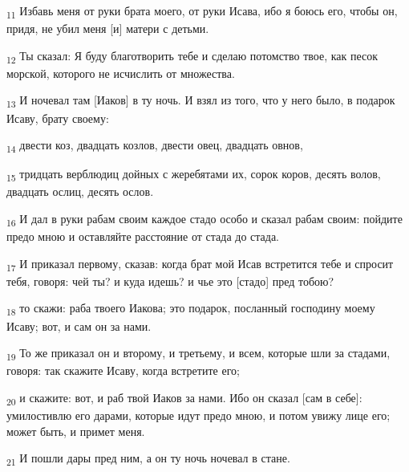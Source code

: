\begin{tcolorbox}
\textsubscript{11} Избавь меня от руки брата моего, от руки Исава, ибо я боюсь его, чтобы он, придя, не убил меня [и] матери с детьми.
\end{tcolorbox}
\begin{tcolorbox}
\textsubscript{12} Ты сказал: Я буду благотворить тебе и сделаю потомство твое, как песок морской, которого не исчислить от множества.
\end{tcolorbox}
\begin{tcolorbox}
\textsubscript{13} И ночевал там [Иаков] в ту ночь. И взял из того, что у него было, в подарок Исаву, брату своему:
\end{tcolorbox}
\begin{tcolorbox}
\textsubscript{14} двести коз, двадцать козлов, двести овец, двадцать овнов,
\end{tcolorbox}
\begin{tcolorbox}
\textsubscript{15} тридцать верблюдиц дойных с жеребятами их, сорок коров, десять волов, двадцать ослиц, десять ослов.
\end{tcolorbox}
\begin{tcolorbox}
\textsubscript{16} И дал в руки рабам своим каждое стадо особо и сказал рабам своим: пойдите предо мною и оставляйте расстояние от стада до стада.
\end{tcolorbox}
\begin{tcolorbox}
\textsubscript{17} И приказал первому, сказав: когда брат мой Исав встретится тебе и спросит тебя, говоря: чей ты? и куда идешь? и чье это [стадо] пред тобою?
\end{tcolorbox}
\begin{tcolorbox}
\textsubscript{18} то скажи: раба твоего Иакова; это подарок, посланный господину моему Исаву; вот, и сам он за нами.
\end{tcolorbox}
\begin{tcolorbox}
\textsubscript{19} То же приказал он и второму, и третьему, и всем, которые шли за стадами, говоря: так скажите Исаву, когда встретите его;
\end{tcolorbox}
\begin{tcolorbox}
\textsubscript{20} и скажите: вот, и раб твой Иаков за нами. Ибо он сказал [сам в себе]: умилостивлю его дарами, которые идут предо мною, и потом увижу лице его; может быть, и примет меня.
\end{tcolorbox}
\begin{tcolorbox}
\textsubscript{21} И пошли дары пред ним, а он ту ночь ночевал в стане.
\end{tcolorbox}
